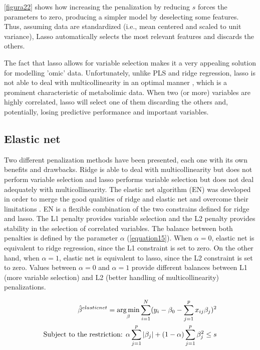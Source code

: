 \autoref{figura22} shows how increasing the penalization by reducing $s$ forces the parameters to zero, producing a simpler model by deselecting some features. Thus, assuming data are standardized (i.e., mean centered and scaled to unit variance), Lasso automatically selects the most relevant features and discards the others.

The fact that lasso allows for variable selection makes it a very appealing solution for modelling 'omic' data. Unfortunately, unlike PLS and ridge regression, lasso is not able to deal with multicollinearity in an optimal manner \parencite{chong2005performance}, which is a prominent characteristic of metabolimic data. When two (or more) variables are highly correlated, lasso will select one of them discarding the others and, potentially, losing predictive performance and important variables.

\subsection{Elastic net}
Two different penalization methods have been presented, each one with its own benefits and drawbacks. Ridge is able to deal with multicollinearity but does not perform variable selection and lasso performs variable selection but does not deal adequately with multicollinearity. The elastic net algorithm  (EN) was developed in order to merge the good qualities of ridge and elastic net and overcome their limitations \parencite{zou2005regularization}. EN is a flexible combination of the two constrains defined for ridge and lasso. The L1 penalty provides variable selection and the L2 penalty provides stability in the selection of correlated variables. The balance between both penalties is defined by the parameter $\alpha$  (\autoref{equation15}). When $\alpha=0$, elastic net is equivalent to ridge regression, since the L1 constraint is set to zero. On the other hand, when $\alpha=1$, elastic net is equivalent to lasso, since the L2 constraint is set to zero. Values between $\alpha = 0$ and $\alpha = 1$ provide different balances between L1 (more variable selection) and L2 (better handling of multicollinearity) penalizations.

\vspace{10pt}

\begin{equation}
\label{equation15}
\begin{split}
\hat{\beta}^{elastic net}=\operatorname*{arg\,min}_\beta \sum\limits_{i=1}^N (y_{i}-\beta_{0}-\sum\limits_{j=1}^p x_{ij}\beta_{j})^{2} \\
\textrm{Subject to the restriction: }  \alpha \sum\limits_{j=1}^p |\beta_{j}| + (1-\alpha) \sum\limits_{j=1}^p \beta_{j}^2 \leq s
\end{split}
\end{equation}

